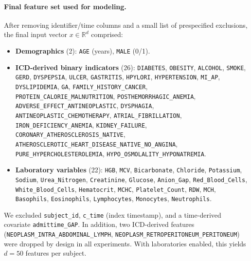 \documentclass[journal,article,submit,pdftex,moreauthors]{Definitions/mdpi}
\begin{document}
\paragraph{Final feature set used for modeling.}
After removing identifier/time columns and a small list of prespecified exclusions, the final input vector $x\in\mathbb{R}^d$ comprised:
\begin{itemize}[leftmargin=12pt,topsep=2pt,itemsep=1pt]
  \item \textbf{Demographics} (2): \texttt{AGE} (years), \texttt{MALE} (0/1).
  \item \textbf{ICD-derived binary indicators} (26): \texttt{DIABETES}, \texttt{OBESITY}, \texttt{ALCOHOL}, \texttt{SMOKE}, \texttt{GERD}, \texttt{DYSPEPSIA}, \texttt{ULCER}, \texttt{GASTRITIS}, \texttt{HPYLORI}, \texttt{HYPERTENSION}, \texttt{MI\_AP}, \texttt{DYSLIPIDEMIA}, \texttt{GA}, \texttt{FAMILY\_HISTORY\_CANCER}, \texttt{PROTEIN\_CALORIE\_MALNUTRITION}, \texttt{POSTHEMORRHAGIC\_ANEMIA}, \texttt{ADVERSE\_EFFECT\_ANTINEOPLASTIC}, \texttt{DYSPHAGIA}, \texttt{ANTINEOPLASTIC\_CHEMOTHERAPY}, \texttt{ATRIAL\_FIBRILLATION}, \texttt{IRON\_DEFICIENCY\_ANEMIA}, \texttt{KIDNEY\_FAILURE}, \texttt{CORONARY\_ATHEROSCLEROSIS\_NATIVE}, \texttt{ATHEROSCLEROTIC\_HEART\_DISEASE\_NATIVE\_NO\_ANGINA}, \texttt{PURE\_HYPERCHOLESTEROLEMIA}, \texttt{HYPO\_OSMOLALITY\_HYPONATREMIA}.
  \item \textbf{Laboratory variables} (22): \texttt{HGB}, \texttt{MCV}, \texttt{Bicarbonate}, \texttt{Chloride}, \texttt{Potassium}, \texttt{Sodium}, \texttt{Urea\_Nitrogen}, \texttt{Creatinine}, \texttt{Glucose}, \texttt{Anion\_Gap}, \texttt{Red\_Blood\_Cells}, \texttt{White\_Blood\_Cells}, \texttt{Hematocrit}, \texttt{MCHC}, \texttt{Platelet\_Count}, \texttt{RDW}, \texttt{MCH}, \texttt{Basophils}, \texttt{Eosinophils}, \texttt{Lymphocytes}, \texttt{Monocytes}, \texttt{Neutrophils}.
\end{itemize}
We excluded \texttt{subject\_id}, \texttt{c\_time} (index timestamp), and a time-derived covariate \texttt{admittime\_GAP}. In addition, two ICD-derived features (\texttt{NEOPLASM\_INTRA\_ABDOMINAL\_LYMPH}, \texttt{NEOPLASM\_RETROPERITONEUM\_PERITONEUM}) were dropped by design in all experiments. With laboratories enabled, this yields $d=50$ features per subject.
\end{document}
